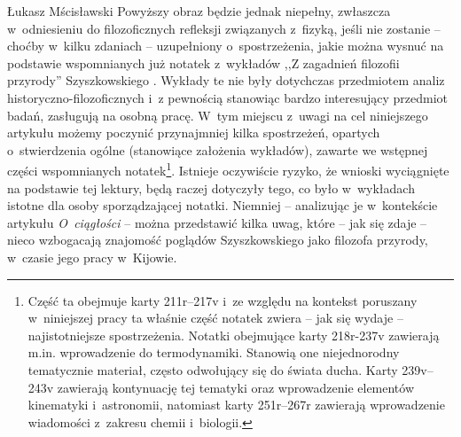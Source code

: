 \begin{artplenv}{Łukasz Mścisławski}
Powyższy obraz będzie jednak niepełny, zwłaszcza w~odniesieniu do filozoficznych refleksji związanych z~fizyką, jeśli nie zostanie -- choćby w~kilku zdaniach -- uzupełniony o~spostrzeżenia, jakie można wysnuć na podstawie wspomnianych już notatek z~wykładów ,,Z zagadnień filozofii przyrody'' Szyszkowskiego
\parencite[por. ][k. 211–244]{noauthor_noty_1917}. %
 Wykłady te nie były dotychczas przedmiotem analiz historyczno-filozoficznych i~z pewnością stanowiąc bardzo interesujący przedmiot badań, zasługują na osobną pracę. W~tym miejscu z~uwagi na cel niniejszego artykułu możemy poczynić przynajmniej kilka spostrzeżeń, opartych o~stwierdzenia ogólne (stanowiące założenia wykładów), zawarte we wstępnej części wspomnianych notatek\footnote{Część ta obejmuje karty 211r–217v i~ze względu na kontekst poruszany w~niniejszej pracy ta właśnie część notatek zwiera -- jak się wydaje -- najistotniejsze spostrzeżenia. Notatki obejmujące karty 218r-237v zawierają m.in. wprowadzenie do termodynamiki. Stanowią one niejednorodny tematycznie materiał, często odwołujący się do świata ducha. Karty 239v–243v zawierają kontynuację tej tematyki oraz wprowadzenie elementów kinematyki i~astronomii, natomiast karty 251r–267r zawierają wprowadzenie wiadomości z~zakresu chemii i~biologii.}. Istnieje oczywiście ryzyko, że wnioski wyciągnięte na podstawie tej lektury, będą raczej dotyczyły tego, co było w~wykładach istotne dla osoby sporządzającej notatki. Niemniej -- analizując je w~kontekście artykułu \textit{O~ciągłości} -- można przedstawić kilka uwag, które -- jak się zdaje -- nieco wzbogacają znajomość poglądów Szyszkowskiego jako filozofa przyrody, w~czasie jego pracy w~Kijowie.


\end{artplenv}

